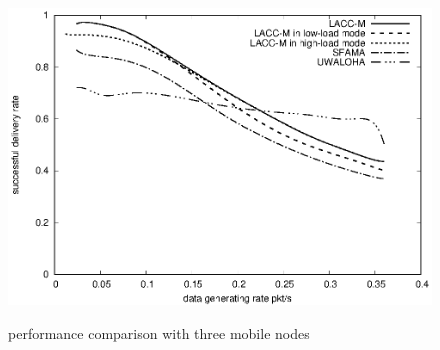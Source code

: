 \documentclass[conference]{IEEEtran}
\begin{document}
\begin{figure}[!h]
	{                    \begin{minipage}{7cm}\centering                                      \includegraphics[scale=0.5]{figures/3nodec.eps} 
	\label{33}
	\end{minipage}
	}
	
	\caption{performance comparison with three mobile nodes}    
    \label{fig:2}                                                 
\end{figure}                                                 
\end{document}
